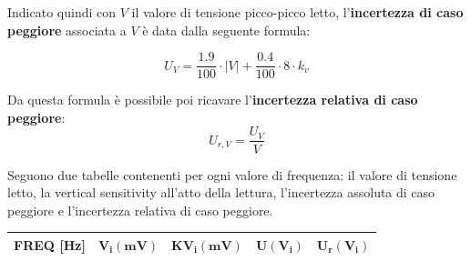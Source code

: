 Indicato quindi con $V$ il valore di tensione picco-picco letto, l'\textbf{incertezza di caso peggiore} associata a $V$ è data dalla seguente formula:

\[U_V = \frac{1.9}{100} \cdot |V| + \frac{0.4}{100} \cdot 8 \cdot k_v\]

Da questa formula è possibile poi ricavare l'\textbf{incertezza relativa di caso peggiore}:
\[U_{r,V} = \frac{U_V}{V}\]

Seguono due tabelle contenenti per ogni valore di frequenza: il valore di tensione letto, la vertical sensitivity all'atto della lettura, l'incertezza assoluta di caso peggiore e l'incertezza relativa di caso peggiore.


\begin{table}[!ht]
    \centering
    \begin{tabular}{|c|c|c|c|c|}
    \hline

        \textbf{FREQ [Hz]} & $\bm{V_i(mV)}$ & $\bm{KV_i(mV)}$ & $\bm{U(V_i)}$ & $\bm{U_r(V_i)}$  \\ \hline


\end{tabular}
\end{table}
